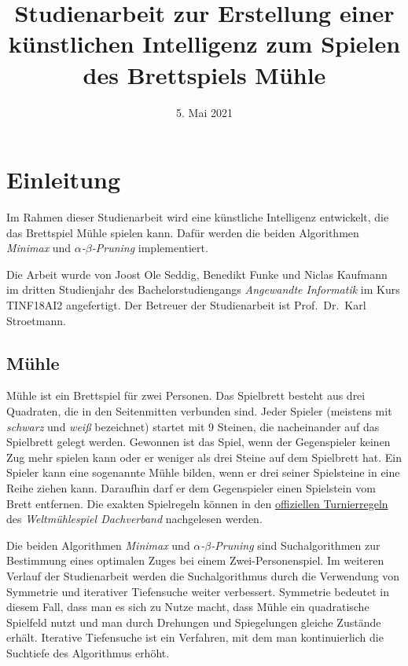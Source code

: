\documentclass[11pt]{article}
\title{Studienarbeit zur Erstellung einer künstlichen Intelligenz zum Spielen des Brettspiels Mühle}
\date{5. Mai 2021}
\begin{document}
    
    \maketitle
    
    

    
    \hypertarget{einleitung}{%
\section{Einleitung}\label{einleitung}}

Im Rahmen dieser Studienarbeit wird eine künstliche Intelligenz
entwickelt, die das Brettspiel Mühle spielen kann. Dafür werden die
beiden Algorithmen \emph{Minimax} und \emph{$\alpha$-$\beta$-Pruning} implementiert.

Die Arbeit wurde von Joost Ole Seddig, Benedikt Funke und Niclas
Kaufmann im dritten Studienjahr des Bachelorstudiengangs
\emph{Angewandte Informatik} im Kurs TINF18AI2 angefertigt. Der Betreuer
der Studienarbeit ist Prof.~Dr.~Karl Stroetmann.

    \hypertarget{muehle}{%
\subsection{Mühle}\label{muehle}}

Mühle ist ein Brettspiel für zwei Personen. Das Spielbrett besteht aus
drei Quadraten, die in den Seitenmitten verbunden sind. Jeder Spieler
(meistens mit \emph{schwarz} und \emph{weiß} bezeichnet) startet mit 9
Steinen, die nacheinander auf das Spielbrett gelegt werden. Gewonnen ist
das Spiel, wenn der Gegenspieler keinen Zug mehr spielen kann oder er
weniger als drei Steine auf dem Spielbrett hat. Ein Spieler kann eine
sogenannte Mühle bilden, wenn er drei seiner Spielsteine in eine Reihe
ziehen kann. Daraufhin darf er dem Gegenspieler einen Spielstein vom
Brett entfernen. Die exakten Spielregeln können in den
\href{http://www.muehlespiel.eu/images/pdf/WMD_Turnierreglement.pdf}{offiziellen
Turnierregeln} des \emph{Weltmühlespiel Dachverband} nachgelesen werden.

Die beiden Algorithmen \emph{Minimax} und \emph{$\alpha$-$\beta$-Pruning} sind
Suchalgorithmen zur Bestimmung eines optimalen Zuges bei einem
Zwei-Personenspiel. Im weiteren Verlauf der Studienarbeit werden die
Suchalgorithmus durch die Verwendung von Symmetrie und iterativer
Tiefensuche weiter verbessert. Symmetrie bedeutet in diesem Fall, dass
man es sich zu Nutze macht, dass Mühle ein quadratische Spielfeld nutzt
und man durch Drehungen und Spiegelungen gleiche Zustände erhält.
Iterative Tiefensuche ist ein Verfahren, mit dem man kontinuierlich die
Suchtiefe des Algorithmus erhöht.
\end{document}
